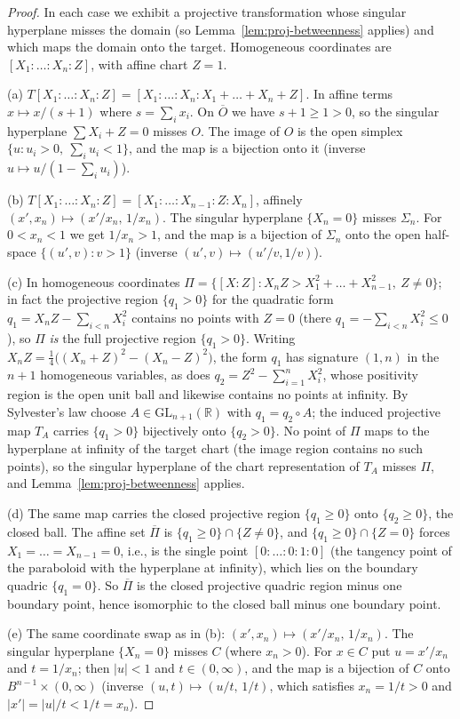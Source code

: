 \documentclass[11pt]{amsart}
\theoremstyle{definition}
\newcommand{\R}{\mathbb{R}}
\newcommand{\GL}{\mathrm{GL}}
\begin{document}
\begin{proof}
In each case we exhibit a projective transformation whose singular
hyperplane misses the domain (so Lemma~\ref{lem:proj-betweenness} applies)
and which maps the domain onto the target. Homogeneous coordinates are
$[X_1{:}\dots{:}X_n{:}Z]$, with affine chart $Z=1$.

(a) $T[X_1{:}\dots{:}X_n{:}Z]=[X_1{:}\dots{:}X_n{:}X_1+\dots+X_n+Z]$. In
affine terms $x\mapsto x/(s+1)$ where $s=\sum_ix_i$. On $\overline O$ we
have $s+1\ge1>0$, so the singular hyperplane $\sum X_i+Z=0$ misses $O$. The
image of $O$ is the open simplex $\{u:u_i>0,\ \sum_iu_i<1\}$, and the map is
a bijection onto it (inverse $u\mapsto u/(1-\sum_iu_i)$).

(b) $T[X_1{:}\dots{:}X_n{:}Z]=[X_1{:}\dots{:}X_{n-1}{:}Z{:}X_n]$, affinely
$(x',x_n)\mapsto(x'/x_n,\,1/x_n)$. The singular hyperplane $\{X_n=0\}$
misses $\Sigma_n$. For $0<x_n<1$ we get $1/x_n>1$, and the map is a
bijection of $\Sigma_n$ onto the open half-space $\{(u',v):v>1\}$ (inverse
$(u',v)\mapsto(u'/v,1/v)$).

(c) In homogeneous coordinates
$\Pi=\{[X{:}Z]:X_nZ>X_1^2+\dots+X_{n-1}^2,\ Z\ne0\}$; in fact the projective
region $\{q_1>0\}$ for the quadratic form
$q_1=X_nZ-\sum_{i<n}X_i^2$ contains no points with $Z=0$ (there
$q_1=-\sum_{i<n}X_i^2\le0$), so $\Pi$ \emph{is} the full projective region
$\{q_1>0\}$. Writing $X_nZ=\tfrac14\bigl((X_n+Z)^2-(X_n-Z)^2\bigr)$, the
form $q_1$ has signature $(1,n)$ in the $n+1$ homogeneous variables, as does
$q_2=Z^2-\sum_{i=1}^nX_i^2$, whose positivity region is the open unit ball
and likewise contains no points at infinity. By Sylvester's law choose
$A\in\GL_{n+1}(\R)$ with $q_1=q_2\circ A$; the induced projective map $T_A$
carries $\{q_1>0\}$ bijectively onto $\{q_2>0\}$. No point of $\Pi$ maps to
the hyperplane at infinity of the target chart (the image region contains no
such points), so the singular hyperplane of the chart representation of
$T_A$ misses $\Pi$, and Lemma~\ref{lem:proj-betweenness} applies.

(d) The same map carries the closed projective region $\{q_1\ge0\}$ onto
$\{q_2\ge0\}$, the closed ball. The affine set $\overline\Pi$ is
$\{q_1\ge0\}\cap\{Z\ne0\}$, and $\{q_1\ge0\}\cap\{Z=0\}$ forces
$X_1=\dots=X_{n-1}=0$, i.e., is the single point
$[0{:}\dots{:}0{:}1{:}0]$ (the tangency point of the paraboloid with the
hyperplane at infinity), which lies on the boundary quadric $\{q_1=0\}$. So
$\overline\Pi$ is the closed projective quadric region minus one boundary
point, hence isomorphic to the closed ball minus one boundary point.

(e) The same coordinate swap as in (b):
$(x',x_n)\mapsto(x'/x_n,\,1/x_n)$. The singular hyperplane $\{X_n=0\}$
misses $C$ (where $x_n>0$). For $x\in C$ put $u=x'/x_n$ and $t=1/x_n$; then
$|u|<1$ and $t\in(0,\infty)$, and the map is a bijection of $C$ onto
$B^{n-1}\times(0,\infty)$ (inverse $(u,t)\mapsto(u/t,\,1/t)$, which
satisfies $x_n=1/t>0$ and $|x'|=|u|/t<1/t=x_n$).
\end{proof}
\end{document}
